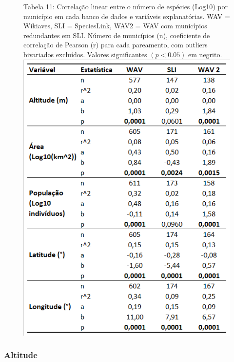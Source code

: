 \begin{figure}[h!]
\centering
{\scriptsize Tabela 11: Correlação linear entre o número de espécies (Log10) por município em cada banco de dados e variáveis explanatórias. WAV = Wikiaves, SLI = SpeciesLink, WAV2 = WAV com municípios redundantes em SLI. Número de municípios (n), coeficiente de correlação de Pearson (r) para cada pareamento, com outliers bivariados excluídos. Valores significantes $(p < 0.05)$ em negrito.}
\\
\includegraphics{Tabelas/11.png}
\end{figure}

\subsubsection{Altitude}

